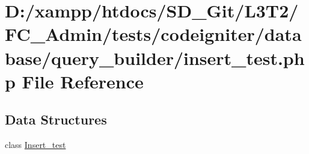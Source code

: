 \hypertarget{_admin_2tests_2codeigniter_2database_2query__builder_2insert__test_8php}{}\section{D\+:/xampp/htdocs/\+S\+D\+\_\+\+Git/\+L3\+T2/\+F\+C\+\_\+\+Admin/tests/codeigniter/database/query\+\_\+builder/insert\+\_\+test.php File Reference}
\label{_admin_2tests_2codeigniter_2database_2query__builder_2insert__test_8php}
\subsection*{Data Structures}
\begin{DoxyCompactItemize}
\item 
class \hyperlink{class_insert__test}{Insert\+\_\+test}
\end{DoxyCompactItemize}
